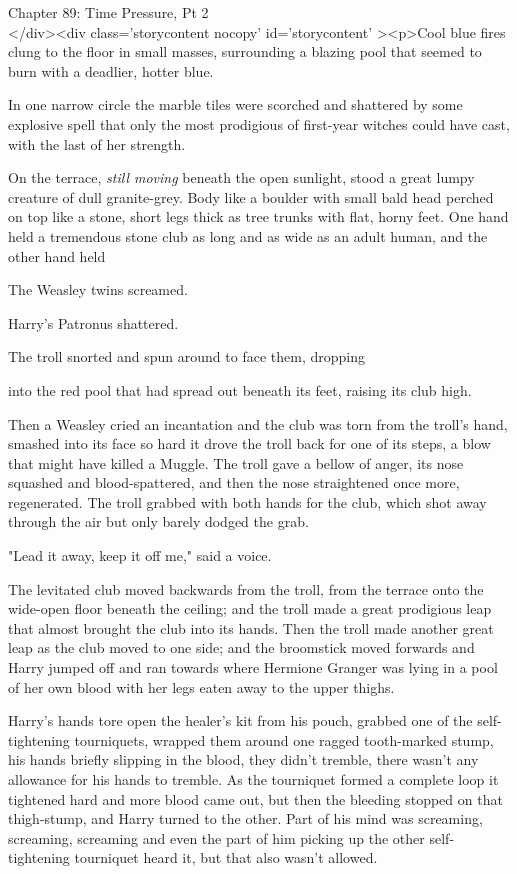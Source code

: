 
Chapter 89: Time Pressure, Pt 2\\
</div><div  class='storycontent nocopy' id='storycontent' ><p>Cool blue fires 
clung to the floor in small masses, surrounding a blazing pool that seemed to 
burn with a deadlier, hotter blue.

In one narrow circle the marble tiles were scorched and shattered by some 
explosive spell that only the most prodigious of first-year witches could have 
cast, with the last of her strength.

On the terrace, \emph{still moving} beneath the open sunlight, stood a great 
lumpy creature of dull granite-grey. Body like a boulder with small bald head 
perched on top like a stone, short legs thick as tree trunks with flat, horny 
feet. One hand held a tremendous stone club as long and as wide as an adult 
human, and the other hand held

The Weasley twins screamed.

Harry's Patronus shattered.

The troll snorted and spun around to face them, dropping

into the red pool that had spread out beneath its feet, raising its club high.

Then a Weasley cried an incantation and the club was torn from the troll's 
hand, smashed into its face so hard it drove the troll back for one of its 
steps, a blow that might have killed a Muggle. The troll gave a bellow of 
anger, its nose squashed and blood-spattered, and then the nose straightened 
once more, regenerated. The troll grabbed with both hands for the club, which 
shot away through the air but only barely dodged the grab.

"Lead it away, keep it off me," said a voice.

The levitated club moved backwards from the troll, from the terrace onto the 
wide-open floor beneath the ceiling; and the troll made a great prodigious leap 
that almost brought the club into its hands. Then the troll made another great 
leap as the club moved to one side; and the broomstick moved forwards and Harry 
jumped off and ran towards where Hermione Granger was lying in a pool of her 
own blood with her legs eaten away to the upper thighs.

Harry's hands tore open the healer's kit from his pouch, grabbed one of the 
self-tightening tourniquets, wrapped them around one ragged tooth-marked stump, 
his hands briefly slipping in the blood, they didn't tremble, there wasn't any 
allowance for his hands to tremble. As the tourniquet formed a complete loop it 
tightened hard and more blood came out, but then the bleeding stopped on that 
thigh-stump, and Harry turned to the other. Part of his mind was screaming, 
screaming, screaming and even the part of him picking up the other 
self-tightening tourniquet heard it, but that also wasn't allowed.

